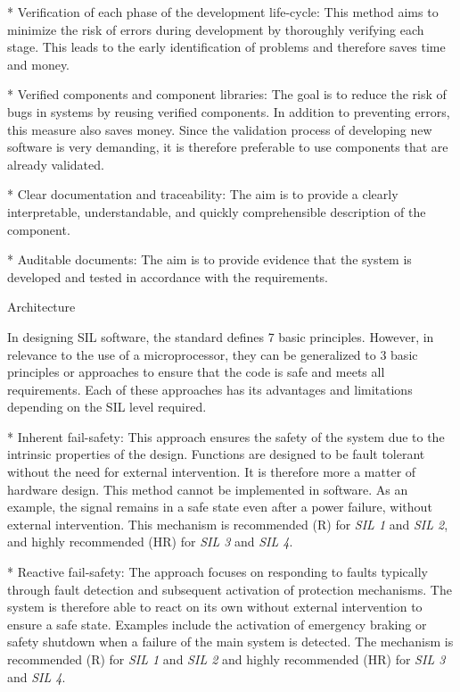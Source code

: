 * {\sbf Verification of each phase of the development life-cycle}: This method aims to minimize the risk of errors during development by thoroughly verifying each stage. This leads to the early identification of problems and therefore saves time and money.

* {\sbf Verified components and component libraries}: The goal is to reduce the risk of bugs in systems by reusing verified components. In addition to preventing errors, this measure also saves money. Since the validation process of developing new software is very demanding, it is therefore preferable to use components that are already validated.

* {\sbf Clear documentation and traceability}: The aim is to provide a clearly interpretable, understandable, and quickly comprehensible description of the component.

* {\sbf Auditable documents}: The aim is to provide evidence that the system is developed and tested in accordance with the requirements.
\enditems

\secc Architecture

In designing SIL software, the standard defines 7 basic principles. However, in relevance to the use of a microprocessor, they can be generalized to 3 basic principles or approaches to ensure that the code is safe and meets all requirements. Each of these approaches has its advantages and limitations depending on the SIL level required.

\begitems
* {\sbf Inherent fail-safety}: This approach ensures the safety of the system due to the intrinsic properties of the design. Functions are designed to be fault tolerant without the need for external intervention. It is therefore more a matter of hardware design. This method cannot be implemented in software. As an example, the signal remains in a safe state even after a power failure, without external intervention. This mechanism is recommended (R) for {\it SIL 1} and {\it SIL 2}, and highly recommended (HR) for {\it SIL 3} and {\it SIL 4}.

* {\sbf Reactive fail-safety}: The approach focuses on responding to faults typically through fault detection and subsequent activation of protection mechanisms. The system is therefore able to react on its own without external intervention to ensure a safe state. Examples include the activation of emergency braking or safety shutdown when a failure of the main system is detected. The mechanism is recommended (R) for {\it SIL 1} and {\it SIL 2} and highly recommended (HR) for {\it SIL 3} and {\it SIL 4}.


